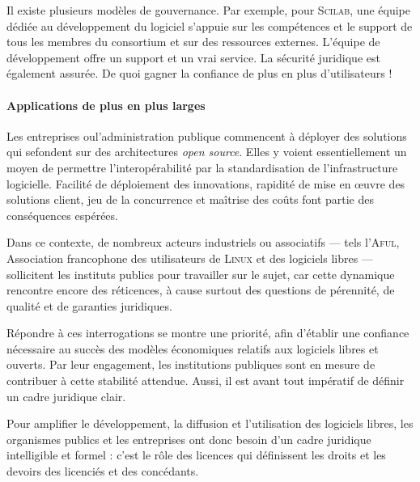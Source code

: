 Il existe plusieurs modèles de gouvernance. Par exemple, pour \textsc{Scilab}, une équipe dédiée au développement du logiciel s'appuie sur les compétences et le support de tous les membres du consortium et sur des ressources externes. L'équipe de développement offre un support et un vrai service. La sécurité juridique est également assurée. De quoi gagner la confiance de plus en plus d'utilisateurs !

\paragraph{Applications de plus en plus larges}

Les entreprises ou\linebreak l'administration publique commencent à déployer des solutions qui se\linebreak fondent sur des architectures \textit{open source}. Elles y voient essentiellement un moyen de permettre l'interopérabilité par la standardisation de l'infrastructure logicielle. Facilité de déploiement des innovations, rapidité de mise en œuvre des solutions client, jeu de la concurrence et maîtrise des coûts font partie des conséquences espérées.

Dans ce contexte, de nombreux acteurs industriels ou associatifs --- tels l'\textsc{Aful}, Association francophone des utilisateurs de \textsc{Linux} et des logiciels libres --- sollicitent les instituts publics pour travailler sur le sujet, car cette dynamique rencontre encore des réticences, à cause surtout des questions de pérennité, de qualité et de garanties juridiques.

Répondre à ces interrogations se montre une priorité, afin d'établir une confiance nécessaire au succès des modèles économiques relatifs aux logiciels libres et ouverts. Par leur engagement, les institutions publiques sont en mesure de contribuer à cette stabilité attendue. Aussi, il est avant tout impératif de définir un cadre juridique clair.


%
Pour amplifier le développement, la diffusion et l'utilisation des logiciels libres, les organismes publics et les entreprises ont donc besoin d'un cadre juridique intelligible et formel : c'est le rôle des licences qui définissent les droits et les devoirs des licenciés et des concédants.

